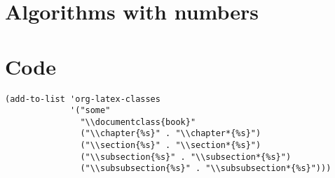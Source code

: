 \documentclass{book}
\begin{document}
\chapter{Algorithms with numbers}
\label{sec:org9cdd780}
\backmatter
\chapter{Code}
\label{sec:org95fba04}
\begin{verbatim}
(add-to-list 'org-latex-classes
             '("some"
               "\\documentclass{book}"
               ("\\chapter{%s}" . "\\chapter*{%s}")
               ("\\section{%s}" . "\\section*{%s}")
               ("\\subsection{%s}" . "\\subsection*{%s}")
               ("\\subsubsection{%s}" . "\\subsubsection*{%s}")))
\end{verbatim}
\end{document}
